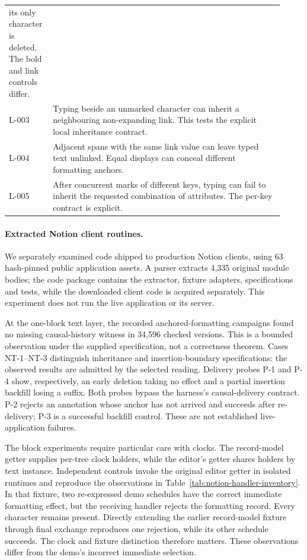 \begin{table}[t]
\begin{tabular}{p{0.13\linewidth}p{0.79\linewidth}}
its only character is deleted. The bold and link controls differ. \\
L-003 & Typing beside an unmarked character can inherit a neighbouring
non-expanding link. This tests the explicit local inheritance contract. \\
L-004 & Adjacent spans with the same link value can leave typed text
unlinked. Equal displays can conceal different formatting anchors. \\
L-005 & After concurrent marks of different keys, typing can fail to inherit
the requested combination of attributes. The per-key contract is explicit. \\
\hline
\end{tabular}
\end{table}

\paragraph{Extracted Notion client routines.}
We separately examined code shipped to production Notion clients, using
63 hash-pinned public application assets. A parser extracts 4,335 original
module bodies; the code package contains the extractor, fixture adapters,
specifications and tests, while the downloaded client code is acquired
separately. This experiment does not run the live application or its server.

At the one-block text layer, the recorded anchored-formatting campaigns
found no missing causal-history witness in 34,596 checked versions. This is
a bounded observation under the supplied specification, not a correctness
theorem. Cases NT-1--NT-3 distinguish inheritance and insertion-boundary
specifications: the observed results are admitted by the selected reading.
Delivery probes P-1 and P-4 show, respectively, an early deletion taking no
effect and a partial insertion backfill losing a suffix. Both probes bypass
the harness's causal-delivery contract. P-2 rejects an annotation whose
anchor has not arrived and succeeds after re-delivery; P-3 is a successful
backfill control. These are not established live-application failures.

The block experiments require particular care with clocks. The record-model
getter supplies per-tree clock holders, while the editor's getter shares
holders by text instance. Independent controls invoke the original editor
getter in isolated runtimes and reproduce the observations in
Table~\ref{tab:notion-handler-inventory}. In that fixture, two re-expressed
demo schedules have the correct immediate formatting effect, but the
receiving handler rejects the formatting record. Every character remains
present. Directly extending the earlier record-model fixture through final
exchange reproduces one rejection, while its other schedule succeeds.
The clock and fixture distinction therefore matters. These observations
differ from the demo's incorrect immediate selection.

